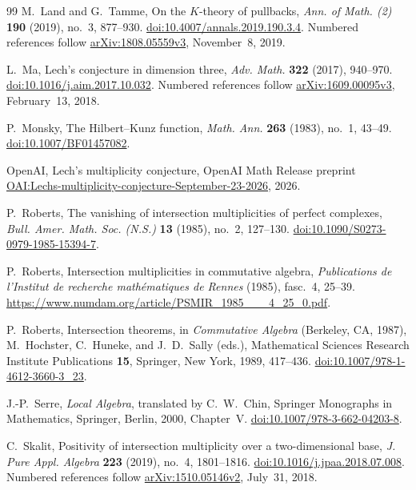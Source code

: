 \begin{thebibliography}{99}
M.~Land and G.~Tamme,
On the $K$-theory of pullbacks,
\emph{Ann. of Math. (2)} \textbf{190} (2019), no.~3, 877--930.
\href{https://doi.org/10.4007/annals.2019.190.3.4}{doi:10.4007/annals.2019.190.3.4}.
Numbered references follow
\href{https://arxiv.org/html/1808.05559v3}{arXiv:1808.05559v3},
November~8, 2019.

L.~Ma,
Lech's conjecture in dimension three,
\emph{Adv. Math.} \textbf{322} (2017), 940--970.
\href{https://doi.org/10.1016/j.aim.2017.10.032}{doi:10.1016/j.aim.2017.10.032}.
Numbered references follow
\href{https://arxiv.org/html/1609.00095v3}{arXiv:1609.00095v3},
February~13, 2018.

P.~Monsky,
The Hilbert--Kunz function,
\emph{Math. Ann.} \textbf{263} (1983), no.~1, 43--49.
\href{https://doi.org/10.1007/BF01457082}{doi:10.1007/BF01457082}.

OpenAI,
Lech's multiplicity conjecture,
OpenAI Math Release preprint
\href{https://github.com/openai/math/blob/main/preprints/Lechs-multiplicity-conjecture-September-23-2026/paper.pdf}{OAI:Lechs-multiplicity-conjecture-September-23-2026},
2026.

P.~Roberts,
The vanishing of intersection multiplicities of perfect complexes,
\emph{Bull. Amer. Math. Soc. (N.S.)} \textbf{13} (1985), no.~2, 127--130.
\href{https://doi.org/10.1090/S0273-0979-1985-15394-7}{doi:10.1090/S0273-0979-1985-15394-7}.

P.~Roberts,
Intersection multiplicities in commutative algebra,
\emph{Publications de l'Institut de recherche math\'ematiques de Rennes}
(1985), fasc.~4, 25--39.
\url{https://www.numdam.org/article/PSMIR_1985___4_25_0.pdf}.

P.~Roberts,
Intersection theorems,
in \emph{Commutative Algebra} (Berkeley, CA, 1987),
M.~Hochster, C.~Huneke, and J.~D.~Sally (eds.),
Mathematical Sciences Research Institute Publications \textbf{15},
Springer, New York, 1989, 417--436.
\href{https://doi.org/10.1007/978-1-4612-3660-3_23}{doi:10.1007/978-1-4612-3660-3\_23}.

J.-P.~Serre,
\emph{Local Algebra},
translated by C.~W.~Chin,
Springer Monographs in Mathematics,
Springer, Berlin, 2000, Chapter~V.
\href{https://doi.org/10.1007/978-3-662-04203-8}{doi:10.1007/978-3-662-04203-8}.

C.~Skalit,
Positivity of intersection multiplicity over a two-dimensional base,
\emph{J. Pure Appl. Algebra} \textbf{223} (2019), no.~4, 1801--1816.
\href{https://doi.org/10.1016/j.jpaa.2018.07.008}{doi:10.1016/j.jpaa.2018.07.008}.
Numbered references follow
\href{https://arxiv.org/abs/1510.05146v2}{arXiv:1510.05146v2},
July~31, 2018.


\end{thebibliography}

